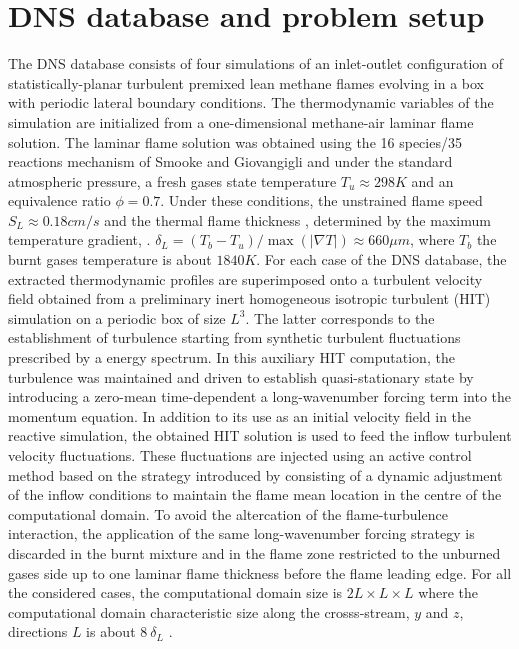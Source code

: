 \section{DNS database and problem setup}

The DNS database consists of four simulations of an inlet-outlet configuration of 
statistically-planar turbulent premixed lean methane flames evolving in a box with periodic 
lateral boundary conditions.
%
The thermodynamic variables of the simulation are initialized from a one-dimensional
methane-air laminar flame solution.
%
The laminar flame solution was obtained using the 16 species/35 reactions mechanism of Smooke and Giovangigli and \cite{smooke1991reduced} under the standard atmospheric pressure, 
a fresh gases state temperature $T_u\approx298K$ and an equivalence ratio $\phi=0.7$.
% 
Under these conditions, the unstrained flame speed $S_L\approx0.18cm/s$ and the thermal flame thickness
, determined by the maximum temperature gradient, \ie. $\delta_L=(T_b-T_u)/\max(|\nabla T|)\approx 660 \mu m$, where $T_b$ the burnt gases temperature is about $1840K$.
%
For each case of the DNS database, the extracted thermodynamic profiles are superimposed onto a turbulent velocity field obtained from a preliminary inert homogeneous isotropic turbulent (HIT) simulation on a periodic box of size $L^3$.
%
The latter corresponds to the establishment of turbulence starting from synthetic turbulent fluctuations
prescribed by a \citet{passot1987numerical} energy spectrum.
%
In this auxiliary HIT computation, the turbulence was maintained and driven to establish quasi-stationary state by introducing a zero-mean time-dependent a long-wavenumber forcing term \cite{aspden2009analysis,aspden2011turbulence} into the momentum equation.
%
In addition to its use as an initial velocity field in the reactive simulation, the obtained HIT
solution is used to feed the inflow turbulent velocity fluctuations.
%
These fluctuations are injected using an active control method \cite{hassanaly2015influence} based on the
strategy introduced by \citet{bell2007active} consisting of a dynamic adjustment of the inflow
conditions to maintain the flame mean location in the centre of the computational domain.
%
To avoid the altercation of the  flame-turbulence interaction, the application of the same 
long-wavenumber forcing strategy is discarded in the burnt mixture and in the flame zone 
restricted to the unburned gases side up to one laminar flame thickness before the
flame leading edge.
%
For all the considered cases, the computational domain size is $2L\times L\times L$ where
the computational domain characteristic size along the crosss-stream, \ie $y$ and $z$, directions
 $L$ is about $8 ~\delta_L$ .

